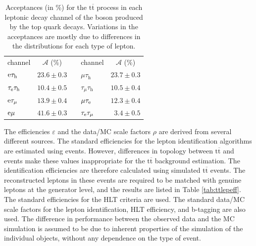 \documentclass[12pt]{thesis}  %
\newcommand{\tauh}{\ensuremath{\tau_{\text{h}}}\xspace}
\newcommand{\Pe}{\ensuremath{\cmsSymbolFace{e}}\xspace}
\renewcommand{\ttbar}{\ensuremath{\mathrm{t}\overline{\mathrm{t}}}\xspace}
\begin{document}
\begin{table}
  \begin{center}
    \begin{tabular}{|l|r|c|l|r|}
      \cline{1-2}\cline{4-5}
      channel & \multicolumn{1}{c|}{$\mathcal{A}$ (\%)} && channel & \multicolumn{1}{c|}{$\mathcal{A}$ (\%)} \\
      \cline{1-2}\cline{4-5}
      $\Pe\tauh$ & $23.6\pm0.3$ && $\mu\tauh$ & $23.7\pm0.3$ \\
      $\tau_{\Pe}\tauh$ & $10.4\pm0.5$ && $\tau_{\mu}\tauh$ & $10.5\pm0.4$ \\
      $\Pe\tau_{\mu}$ & $13.9\pm0.4$ && $\mu\tau_{\Pe}$ & $12.3\pm0.4$ \\
      $\Pe\mu$ & $41.6\pm0.3$ && $\tau_{\Pe}\tau_{\mu}$ & $3.4\pm0.5$ \\
      \cline{1-2}\cline{4-5}
    \end{tabular}
    \caption{Acceptances (in \%) for the \ttbar process in each leptonic decay channel of the \W boson produced by the top quark decays. Variations in the acceptances are mostly due to differences in the \pt distributions for each type of lepton.}
    \label{tab:TTAcc}
  \end{center}
\end{table}

The efficiencies $\varepsilon$ and the data/MC scale factors $\rho$ are derived from several different sources. The standard efficiencies for the lepton identification algorithms are estimated using \Z events. However, differences in topology between \ttbar and \Z events make these values inappropriate for the \ttbar background estimation. The identification efficiencies are therefore calculated using simulated \ttbar events. The reconstructed leptons in these events are required to be matched with genuine leptons at the generator level, and the results are listed in Table \ref{tab:ttlepeff}. The standard efficiencies for the HLT criteria are used. The standard data/MC scale factors for the lepton identification, HLT efficiency, and b-tagging are also used. The difference in performance between the observed data and the MC simulation is assumed to be due to inherent properties of the simulation of the individual objects, without any dependence on the type of event.
\end{document}
